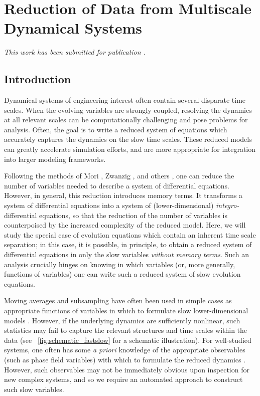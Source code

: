 
\chapter{Reduction of Data from Multiscale Dynamical Systems \label{ch:multiscale}}

\graphicspath{{ch-multiscale/figures/}}

{\em This work has been submitted for publication \citep{dsilva2015data}.}

\section{Introduction}

Dynamical systems of engineering interest often contain several disparate time scales.
%
When the evolving variables are strongly coupled, resolving the
dynamics at all relevant scales can be computationally challenging and pose problems for analysis.
%
Often, the goal is to write a reduced system of equations which accurately captures the dynamics on the slow time scales.
%
These reduced models can greatly accelerate simulation efforts, and are more appropriate for integration into larger modeling frameworks.

Following the methods of Mori \cite{mori1965transport}, Zwanzig \cite{zwanzig1961memory}, and others \cite{brey1981nonlinear, chorin2000optimal, hijon2010mori}, one can reduce the number of variables needed to describe a system of differential equations.
%
However, in general, this reduction introduces memory terms.
%
It transforms a system of differential equations into a system of (lower-dimensional) {\em integro-}differential equations,
so that the reduction of the number of variables is counterpoised by the increased complexity of the  reduced model.
%
Here, we will study the special case of evolution equations which contain an inherent time scale separation;
in this case, it is possible, in principle, to obtain a reduced system of differential equations in only the slow variables {\em without memory terms}.
%
Such an analysis crucially hinges on knowing in which variables (or, more generally, functions of variables) one can write such a reduced system of slow evolution equations.

Moving averages and subsampling have often been used in simple cases as appropriate functions of variables in which to formulate slow lower-dimensional models \cite{pavliotis2007parameter}.
%
However, if the underlying dynamics are sufficiently nonlinear, such statistics may
fail to capture the relevant structures and time scales within the data (see \fig~\ref{fig:schematic_fastslow} for a schematic illustration).
%
For well-studied systems, one often has some {\em a priori} knowledge of the appropriate observables (such as phase field variables) with which to formulate the reduced dynamics \cite{chen2002phase, wheeler1992phase}.
%
However, such observables may not be immediately obvious upon inspection for new complex systems, and so we require an automated approach to construct such slow variables.

